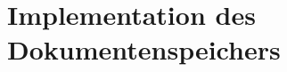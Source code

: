 \documentclass[
    fontsize=12pt,
    headings=small,
    parskip=half,           %
    bibliography=totoc,
    numbers=noenddot,       %
    open=any,               %
    ]{scrreprt}
\begin{document}

\newpage
    \section{Implementation des Dokumentenspeichers}    
    
\end{document}
